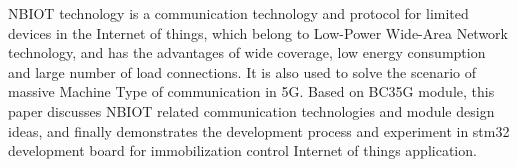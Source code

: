 
\begin{englishabstract}
NBIOT technology is a communication technology and protocol for limited devices in the Internet of things, which belong to Low-Power Wide-Area Network technology, and has the advantages of wide coverage, low energy consumption and large number of load connections. It is also used to solve the scenario of massive Machine Type of communication in 5G. Based on BC35G module, this paper discusses NBIOT related communication technologies and module design ideas, and finally demonstrates the development process and experiment in stm32 development board for immobilization control Internet of things application.
	
\end{englishabstract}



